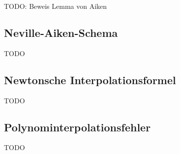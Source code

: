 TODO: Beweis Lemma von Aiken

\subsection{Neville-Aiken-Schema}
TODO

\subsection{Newtonsche Interpolationsformel}

TODO

\subsection{Polynominterpolationsfehler}

TODO

